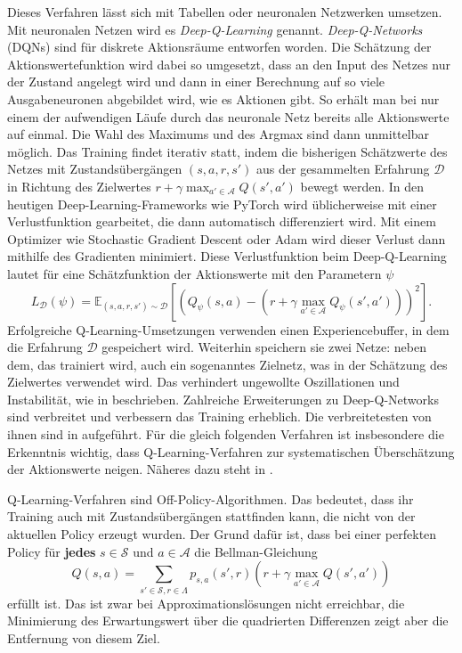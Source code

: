 Dieses Verfahren lässt sich mit Tabellen oder neuronalen Netzwerken umsetzen.
Mit neuronalen Netzen wird es \textit{Deep-Q-Learning} genannt.
\textit{Deep-Q-Networks} (DQNs) sind für diskrete Aktionsräume entworfen worden.
Die Schätzung der Aktionswertefunktion wird dabei so umgesetzt, dass an den Input des Netzes nur der Zustand angelegt wird und dann in einer Berechnung auf so viele Ausgabeneuronen abgebildet wird, wie es Aktionen gibt.
So erhält man bei nur einem der aufwendigen Läufe durch das neuronale Netz bereits alle Aktionswerte auf einmal.
Die Wahl des Maximums und des Argmax sind dann unmittelbar möglich.
Das Training findet iterativ statt, indem die bisherigen Schätzwerte des Netzes mit Zustandsübergängen $(s, a, r, s')$ aus der gesammelten Erfahrung $\mathcal{D}$ in Richtung des Zielwertes $r+\gamma \max_{a'\in\mathcal{A}}{Q(s',a')}$ bewegt werden.
In den heutigen Deep-Learning-Frameworks wie PyTorch \cite{NEURIPS2019_9015} wird üblicherweise mit einer Verlustfunktion gearbeitet, die dann automatisch differenziert wird.
Mit einem Optimizer wie Stochastic Gradient Descent oder Adam \cite{adam2014} wird dieser Verlust dann mithilfe des Gradienten minimiert.
Diese Verlustfunktion beim Deep-Q-Learning lautet für eine Schätzfunktion der Aktionswerte mit den Parametern $\psi$
\begin{equation}
	L_\mathcal{D}(\psi) = \mathbb{E}_{(s, a, r, s')\sim\mathcal{D}}\left[\left(Q_\psi(s,a)-\left(r+\gamma \max_{a'\in\mathcal{A}}{Q_\psi(s',a')}\right)\right)^2\right].
\end{equation}
Erfolgreiche Q-Learning-Umsetzungen verwenden einen Experiencebuffer, in dem die Erfahrung $\mathcal{D}$ gespeichert wird.
Weiterhin speichern sie zwei Netze: neben dem, das trainiert wird, auch ein sogenanntes Zielnetz, was in der Schätzung des Zielwertes verwendet wird.
Das verhindert ungewollte Oszillationen und Instabilität, wie in \cite{atari2014} beschrieben.
Zahlreiche Erweiterungen zu Deep-Q-Networks sind verbreitet und verbessern das Training erheblich.
Die verbreitetesten von ihnen sind in \cite{qlearningcomparison2017} aufgeführt.
Für die gleich folgenden Verfahren ist insbesondere die Erkenntnis wichtig, dass Q-Learning-Verfahren zur systematischen Überschätzung der Aktionswerte neigen.
Näheres dazu steht in \cite{qlearningoverestimation}.

Q-Learning-Verfahren sind Off-Policy-Algorithmen.
Das bedeutet, dass ihr Training auch mit Zustandsübergängen stattfinden kann, die nicht von der aktuellen Policy erzeugt wurden.
Der Grund dafür ist, dass bei einer perfekten Policy für \textbf{jedes} $s \in \mathcal{S}$ und $a \in \mathcal{A}$ die Bellman-Gleichung
\begin{equation}
	Q(s, a) = \sum_{s'\in\mathcal{S}, r \in \Lambda}{p_{s, a}\left(s', r\right) \left(r + \gamma \max_{a' \in \mathcal{A}}{Q(s', a')}\right)}
\end{equation}
erfüllt ist.
Das ist zwar bei Approximationslösungen nicht erreichbar, die Minimierung des Erwartungswert über die quadrierten Differenzen zeigt aber die Entfernung von diesem Ziel.

